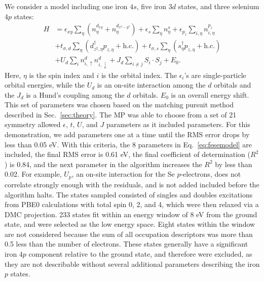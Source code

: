 We consider a model including one iron $4s$, five iron $3d$ states, and three selenium $4p$ states:
\begin{align}
  H 
  &=
  \epsilon_{xy} \sum_{\eta} (n^{d_{xy}}_{\eta}  + n^{d_{x^2-y^2}}_{\eta})
  +
  \epsilon_s \sum_{\eta} n^{s}_{\eta} 
  +
  \epsilon_{p_{z}} \sum_{i,\eta} n^{p_{z}}_{i,\eta} 
  \nonumber \\
  &+ 
  t_{\sigma,d} \sum_{\eta} \left( d_{z^2,\eta}^{\dagger} p_{z,\eta} + \text{h.c.} \right)
  +
  t_{\sigma,s} \sum_{\eta} \left(s_{\eta}^{\dagger}  p_{z,\eta} + \text{h.c.} \right)
  \nonumber \\
  &+
  U_d \sum_{i} n^{d}_{i,\uparrow} n^{d}_{i,\downarrow} 
  +
  J_d \sum_{i\ne j} S_i \cdot S_j
  +
  E_0. \label{eq:fesemodel}
\end{align}
Here, $\eta$ is the spin index and $i$ is the orbital index.
The $\epsilon_i$'s are single-particle orbital energies, while the $U_d$ is an on-site interaction among the $d$ orbitals and the $J_d$ is a Hund's coupling among the $d$ orbitals.
$E_0$ is an overall energy shift.
This set of parameters was chosen based on the matching pursuit method described in Sec.~\ref{sec:theory}.
The MP was able to choose from a set of 21 symmetry allowed $\epsilon$, $t$, $U$, and $J$ parameters as it included parameters.  
For this demonstration, we add parameters one at a time until the RMS error drops by less than 0.05 eV. 
With this criteria, the 8 parameters in Eq.~\ref{eq:fesemodel} are included, the final RMS error is 0.61 eV, the final coefficient of determination ($R^2$) is 0.84, and the next parameter in the algorithm increases the $R^2$ by less than 0.02. 
For example, $U_p$, an on-site interaction for the Se $p$-electrons, does not correlate strongly enough with the residuals, and is not added included before the algorithm halts.
The states sampled consisted of singles and doubles excitations from PBE0 calculations with total spin 0, 2, and 4, which were then relaxed via a DMC projection.
233 states fit within an energy window of 8 eV from the ground state, and were selected as the low energy space.
Eight states within the window are not considered because the sum of all occupation descriptors was more than 0.5 less than the number of electrons.
These states generally have a significant iron $4p$ component relative to the ground state, and therefore were excluded, as they are not describable without several additional parameters describing the iron $p$ states.

